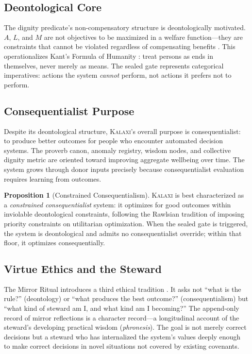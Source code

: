 \documentclass[12pt,a4paper]{article}
\theoremstyle{definition}
\newtheorem{proposition}{Proposition}[section]
\theoremstyle{remark}
\newcommand{\kalaxi}{\textsc{Kalaxi}}
\begin{document}
\subsection{Deontological Core}

The dignity predicate's non-compensatory structure is deontologically motivated. $A$,
$L$, and $M$ are not objectives to be maximized in a welfare function—they are
constraints that cannot be violated regardless of compensating benefits \cite{belton2002}.
This operationalizes Kant's Formula of Humanity \cite{kant1785}: treat persons as ends
in themselves, never merely as means. The sealed gate represents categorical
imperatives: actions the system \emph{cannot} perform, not actions it prefers not to
perform.

\subsection{Consequentialist Purpose}

Despite its deontological structure, \kalaxi{}'s overall purpose is consequentialist:
to produce better outcomes for people who encounter automated decision systems. The
proverb canon, anomaly registry, wisdom nodes, and collective dignity metric are
oriented toward improving aggregate wellbeing over time. The system grows through
donor inputs precisely because consequentialist evaluation requires learning from
outcomes.

\begin{proposition}[Constrained Consequentialism]
\label{prop:constrained}
\kalaxi{} is best characterized as a \emph{constrained consequentialist} system: it
optimizes for good outcomes within inviolable deontological constraints, following the
Rawlsian \cite{rawls1999} tradition of imposing priority constraints on utilitarian
optimization. When the sealed gate is triggered, the system is deontological and
admits no consequentialist override; within that floor, it optimizes consequentially.
\end{proposition}

\subsection{Virtue Ethics and the Steward}

The Mirror Ritual introduces a third ethical tradition \cite{macintyre2007}. It asks
not ``what is the rule?'' (deontology) or ``what produces the best outcome?''
(consequentialism) but ``what kind of steward am I, and what kind am I becoming?''
The append-only record of mirror reflections is a character record—a longitudinal
account of the steward's developing practical wisdom (\emph{phronesis}). The goal is
not merely correct decisions but a steward who has internalized the system's values
deeply enough to make correct decisions in novel situations not covered by existing
covenants.
\end{document}
